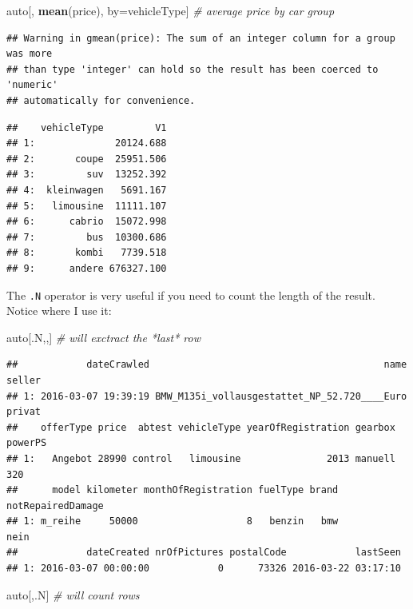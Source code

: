 \documentclass[]{book}
\newenvironment{Shaded}{\begin{snugshade}}{\end{snugshade}}
\newcommand{\KeywordTok}[1]{\textcolor[rgb]{0.13,0.29,0.53}{\textbf{#1}}}
\newcommand{\CommentTok}[1]{\textcolor[rgb]{0.56,0.35,0.01}{\textit{#1}}}
\newcommand{\NormalTok}[1]{#1}
\theoremstyle{definition}
\theoremstyle{definition}
\theoremstyle{definition}
\theoremstyle{remark}
\begin{document}
\begin{Shaded}
\begin{Highlighting}[]
\NormalTok{auto[, }\KeywordTok{mean}\NormalTok{(price), by=vehicleType] }\CommentTok{# average price by car group}
\end{Highlighting}
\end{Shaded}

\begin{verbatim}
## Warning in gmean(price): The sum of an integer column for a group was more
## than type 'integer' can hold so the result has been coerced to 'numeric'
## automatically for convenience.
\end{verbatim}

\begin{verbatim}
##    vehicleType         V1
## 1:              20124.688
## 2:       coupe  25951.506
## 3:         suv  13252.392
## 4:  kleinwagen   5691.167
## 5:   limousine  11111.107
## 6:      cabrio  15072.998
## 7:         bus  10300.686
## 8:       kombi   7739.518
## 9:      andere 676327.100
\end{verbatim}

The \texttt{.N} operator is very useful if you need to count the length
of the result. Notice where I use it:

\begin{Shaded}
\begin{Highlighting}[]
\NormalTok{auto[.N,,] }\CommentTok{# will exctract the *last* row}
\end{Highlighting}
\end{Shaded}

\begin{verbatim}
##            dateCrawled                                         name seller
## 1: 2016-03-07 19:39:19 BMW_M135i_vollausgestattet_NP_52.720____Euro privat
##    offerType price  abtest vehicleType yearOfRegistration gearbox powerPS
## 1:   Angebot 28990 control   limousine               2013 manuell     320
##      model kilometer monthOfRegistration fuelType brand notRepairedDamage
## 1: m_reihe     50000                   8   benzin   bmw              nein
##            dateCreated nrOfPictures postalCode            lastSeen
## 1: 2016-03-07 00:00:00            0      73326 2016-03-22 03:17:10
\end{verbatim}

\begin{Shaded}
\begin{Highlighting}[]
\NormalTok{auto[,.N] }\CommentTok{# will count rows}
\end{Highlighting}
\end{Shaded}
\end{document}
